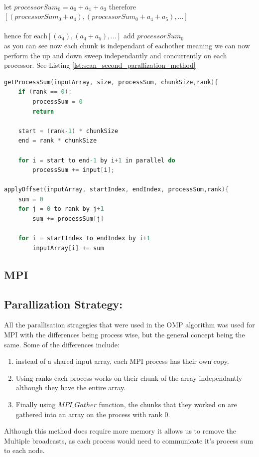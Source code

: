 \\let $processorSum_0 = a_0+a_1+a_3$ therefore\\
$[(processorSum_0+a_4),(processorSum_0 + a_4 +a_5),\dots] $\\\\hence for each$ [(a_4),(a_4 +a_5),\dots]$ add $processorSum_0$\\
as you can see now each chunk is independant of eachother meaning we can now perform the up and down sweep independantly and concurrently on each processor. See Listing \ref{lst:scan_second_parallization_method} 
\begin{lstlisting}[language=C, caption={Serial Sequenctial Scan Algorithm with + operator}, label={lst:scan_second_parallization_method}]
getProcessSum(inputArray, size, processSum, chunkSize,rank){ 
	if (rank == 0):  
		processSum = 0 
		return 
	 
	start = (rank-1) * chunkSize 
	end = rank * chunkSize
	
	for i = start to end-1 by i+1 in parallel do
		processSum += input[i];
	 
applyOffset(inputArray, startIndex, endIndex, processSum,rank){ 
	sum = 0 
	for j = 0 to rank by j+1
		sum += processSum[j] 
		
	for i = startIndex to endIndex by i+1
		inputArray[i] += sum
\end{lstlisting}
\subsection{MPI}
\subsection*{Parallization Strategy:}
All the parallisation stragegies that were used in the OMP algorithm was used for MPI with the differences being process wise, but the general concept being the same. Some of the differences include: 
\begin{enumerate}
	\item instead of a shared input array, each MPI process has their own copy.
	\item Using ranks each process works on their chunk of the array independantly although they have the entire array.
	\item Finally using ${MPI\_Gather}$ function, the chunks that they worked on are gathered into an array on the process with rank 0. 
\end{enumerate}
Although this method does require more memory it allows us to remove the Multiple broadcasts, as each process would need to communicate it's process sum to each node.  

